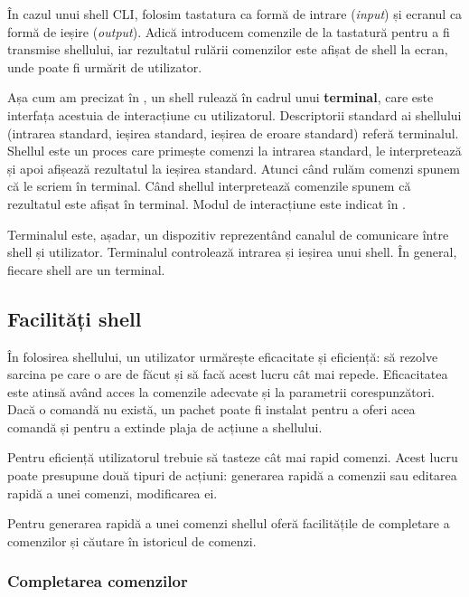 În cazul unui shell CLI, folosim tastatura ca formă de intrare (\textit{input}) și ecranul ca formă de ieșire (\textit{output}). Adică introducem comenzile de la tastatură pentru a fi transmise shellului, iar rezultatul rulării comenzilor este afișat de shell la ecran, unde poate fi urmărit de utilizator.

Așa cum am precizat în , un shell rulează în cadrul unui \textbf{terminal}, care este interfața acestuia de
interacțiune cu utilizatorul. Descriptorii standard ai shellului (intrarea standard, ieșirea standard, ieșirea de eroare standard) referă terminalul.
Shellul este un proces care primește comenzi la intrarea standard, le
interpretează și apoi afișează rezultatul la ieșirea standard. Atunci când rulăm
comenzi spunem că le scriem în terminal. Când shellul interpretează comenzile
spunem că rezultatul este afișat în terminal. Modul de interacțiune este indicat în .

Terminalul este, așadar, un dispozitiv reprezentând canalul de comunicare între shell și
utilizator. Terminalul controlează intrarea și ieșirea unui shell. În general,
fiecare shell are un terminal.

\subsection{Facilități shell}
\label{sec:cli:shell:features}

În folosirea shellului, un utilizator urmărește eficacitate și eficiență: să
rezolve sarcina pe care o are de făcut și să facă acest lucru cât mai repede.
Eficacitatea este atinsă având acces la comenzile adecvate și la parametrii
corespunzători. Dacă o comandă nu există, un pachet poate fi instalat pentru a
oferi acea comandă și pentru a extinde plaja de acțiune a shellului.

Pentru eficiență utilizatorul trebuie să tasteze cât mai rapid comenzi. Acest
lucru poate presupune două tipuri de acțiuni: generarea rapidă a comenzii sau
editarea rapidă a unei comenzi, modificarea ei.

Pentru generarea rapidă a unei comenzi shellul oferă facilitățile de completare a comenzilor și căutare în istoricul de comenzi.

\subsubsection{Completarea comenzilor}
\label{sec:cli:shell:features:completion}

